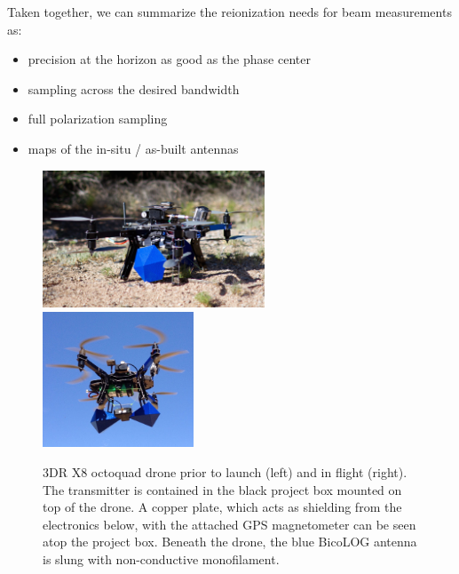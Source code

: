 \documentclass[preprint2,numberedappendix,tighten,twocolappendix]{aastex6}
\begin{document}
Taken together, we can summarize the reionization needs for beam measurements as:
\begin{itemize}
\item precision at the horizon as good as the phase center
\item sampling across the desired bandwidth
\item full polarization sampling
\item maps of the in-situ / as-built antennas
\end{itemize} 


\begin{figure}[htb]
\centering
\includegraphics[width=0.59\textwidth]{figures/drone2.png}
\includegraphics[width=0.4\textwidth]{figures/drone.png}
\caption{3DR X8 octoquad drone prior to launch (left) and in flight (right).  The transmitter is contained in the black project box mounted on top of the drone.  A copper plate, which acts as shielding from the electronics below, with the attached GPS magnetometer can be seen atop the project box. Beneath the drone, the blue  BicoLOG antenna is slung with non-conductive monofilament.}
\label{fig:drone}
\end{figure}
\end{document}
